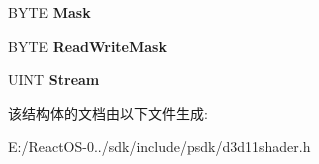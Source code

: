 \begin{DoxyCompactItemize}
\mbox{\label{struct___d3_d11___s_i_g_n_a_t_u_r_e___p_a_r_a_m_e_t_e_r___d_e_s_c_ad352ceda76f90d561e1b2f77925a7bc0}} 
B\+Y\+TE {\bfseries Mask}
\item 
\mbox{\label{struct___d3_d11___s_i_g_n_a_t_u_r_e___p_a_r_a_m_e_t_e_r___d_e_s_c_af57bb3ac5aff344e2e9c3c36a7ea582b}} 
B\+Y\+TE {\bfseries Read\+Write\+Mask}
\item 
\mbox{\label{struct___d3_d11___s_i_g_n_a_t_u_r_e___p_a_r_a_m_e_t_e_r___d_e_s_c_af367392b3af1bdcf82444ded854c1af6}} 
U\+I\+NT {\bfseries Stream}
\end{DoxyCompactItemize}


该结构体的文档由以下文件生成\+:\begin{DoxyCompactItemize}
\item 
E\+:/\+React\+O\+S-\/0../sdk/include/psdk/d3d11shader.\+h\end{DoxyCompactItemize}
